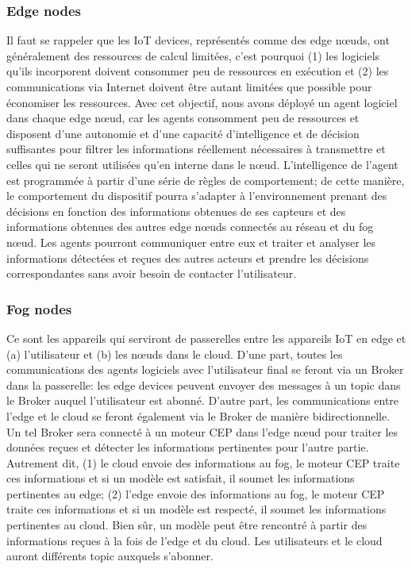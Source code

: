 \subsubsection{Edge nodes} Il faut se rappeler que les IoT devices, représentés comme des edge nœuds, ont généralement des ressources de calcul limitées, c'est pourquoi (1) les logiciels qu'ils incorporent doivent consommer peu de ressources en exécution et (2) les communications via Internet doivent être autant limitées que possible pour économiser les ressources. Avec cet objectif, nous avons déployé un agent logiciel dans chaque edge nœud, car les agents consomment peu de ressources et disposent d'une autonomie et d'une capacité d'intelligence et de décision suffisantes pour filtrer les informations réellement nécessaires à transmettre et celles qui ne seront utilisées qu'en interne dans le nœud. L'intelligence de l'agent est programmée à partir d'une série de règles de comportement; de cette manière, le comportement du dispositif pourra s'adapter à l'environnement prenant des décisions en fonction des informations obtenues de ses capteurs et des informations obtenues des autres edge nœuds connectés au réseau et du fog nœud. Les agents pourront communiquer entre eux et traiter et analyser les informations détectées et reçues des autres acteurs et prendre les décisions correspondantes sans avoir besoin de contacter l'utilisateur.


\subsubsection{Fog nodes}
Ce sont les appareils qui serviront de passerelles entre les appareils IoT en edge et (a) l'utilisateur et (b) les nœuds dans le cloud. D'une part, toutes les communications des agents logiciels avec l'utilisateur final se feront via un Broker dans la passerelle: les edge devices peuvent envoyer des messages à un topic dans le Broker auquel l'utilisateur est abonné. D'autre part, les communications entre l’edge et le cloud se feront également via le Broker de manière bidirectionnelle. Un tel Broker sera connecté à un moteur CEP dans l’edge nœud pour traiter les données reçues et détecter les informations pertinentes pour l'autre partie. Autrement dit, (1) le cloud envoie des informations au fog, le moteur CEP traite ces informations et si un modèle est satisfait, il soumet les informations pertinentes au edge; (2) l'edge envoie des informations au fog, le moteur CEP traite ces informations et si un modèle est respecté, il soumet les informations pertinentes au cloud. Bien sûr, un modèle peut être rencontré à partir des informations reçues à la fois de l’edge et du cloud. Les utilisateurs et le cloud auront différents topic auxquels s'abonner.

